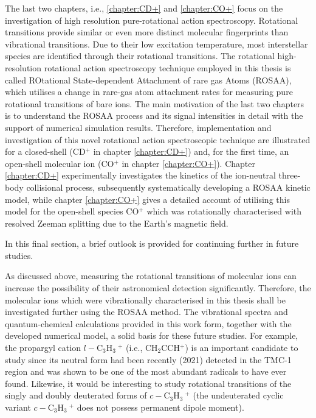 The last two chapters, i.e., \ref{chapter:CD+} and \ref{chapter:CO+} focus on the investigation of high resolution pure-rotational action spectroscopy. Rotational transitions provide similar or even more distinct molecular fingerprints than vibrational transitions. Due to their low excitation temperature, most interstellar species are identified through their rotational transitions. The rotational high-resolution rotational action spectroscopy technique employed in this thesis is called ROtational State-dependent Attachment of rare gas Atoms (ROSAA), which utilises a change in rare-gas atom attachment rates for measuring pure rotational transitions of bare ions. The main motivation of the last two chapters is to understand the ROSAA process and its signal intensities in detail with the support of numerical simulation results. Therefore, implementation and investigation of this novel rotational action spectroscopic technique are illustrated for a closed-shell (CD$^+$ in chapter \ref{chapter:CD+}) and, for the first time, an open-shell molecular ion (CO$^+$ in chapter \ref{chapter:CO+}). Chapter \ref{chapter:CD+} experimentally investigates the kinetics of the ion-neutral three-body collisional process, subsequently systematically developing a ROSAA kinetic model, while chapter \ref{chapter:CO+} gives a detailed account of utilising this model for the open-shell species CO$^+$ which was rotationally characterised with resolved Zeeman splitting due to the Earth's magnetic field.


In this final section, a brief outlook is provided for continuing further in future studies.

As discussed above, measuring the rotational transitions of molecular ions can increase the possibility of their astronomical detection significantly. Therefore, the molecular ions which were vibrationally characterised in this thesis shall be investigated further using the ROSAA method. The vibrational spectra and quantum-chemical calculations provided in this work form, together with the developed numerical model, a solid basis for these future studies. For example, the propargyl cation $l-$C$_3$H$_3\ ^+$ (i.e., CH$_2$CCH$^+$) is an important candidate to study since its neutral form had been recently (2021) detected in the TMC-1 region and was shown to be one of the most abundant radicals to have ever found. Likewise, it would be interesting to study rotational transitions of the singly and doubly deuterated forms of $c-$C$_3$H$_3\ ^+$ (the undeuterated cyclic variant $c-$C$_3$H$_3\ ^+$ does not possess permanent dipole moment).

